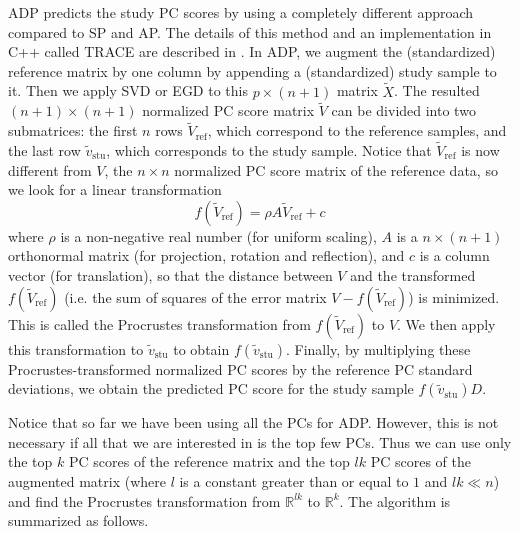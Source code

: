 \documentclass{article}
\newcommand{\bR}{\mathbb{R}}
\newcommand{\ostu}{\operatorname{stu}}
\newcommand{\oref}{\operatorname{ref}}
\begin{document}
ADP predicts the study PC scores by using a completely different approach
compared to SP and AP.
The details of this method
and an implementation in C++ called TRACE
are described in \cite{wang2014ancestry,wang2015improved}.
In ADP,
we augment the (standardized) reference matrix by one column
by appending a (standardized) study sample to it.
Then we apply SVD or EGD to this $p \times (n+1)$ matrix $\tilde{X}$.
The resulted $(n+1) \times (n+1)$ normalized PC score matrix $\tilde{V}$
can be divided into two submatrices:
the first $n$ rows $\tilde{V}_{\oref}$,
which correspond to the reference samples,
and the last row $\tilde{v}_{\ostu}$,
which corresponds to the study sample.
Notice that $\tilde{V}_{\oref}$ is now different from $V$,
the $n \times n$ normalized PC score matrix of the reference data,
so we look for a linear transformation
\[
    f(\tilde{V}_{\oref}) = \rho A \tilde{V}_{\oref} + c
\]
where $\rho$ is a non-negative real number
(for uniform scaling),
$A$ is a $n \times (n+1)$ orthonormal matrix
(for projection, rotation and reflection),
and $c$ is a column vector
(for translation),
so that the distance
between $V$ and the transformed $f(\tilde{V}_{\oref})$
(i.e. the sum of squares of the error matrix $V - f(\tilde{V}_{\oref})$)
is minimized.
This is called the Procrustes transformation
from $f(\tilde{V}_{\oref})$ to $V$.
We then apply this transformation to $\tilde{v}_{\ostu}$
to obtain $f(\tilde{v}_{\ostu})$.
Finally,
by multiplying these Procrustes-transformed normalized PC scores
by the reference PC standard deviations,
we obtain the predicted PC score for the study sample $f(\tilde{v}_{\ostu})D$.

Notice that so far we have been using all the PCs for ADP.
However, this is not necessary
if all that we are interested in
is the top few PCs.
Thus we can use only
the top $k$ PC scores of the reference matrix
and the top $lk$ PC scores of the augmented matrix
(where $l$ is a constant greater than or equal to $1$ and $lk \ll n$)
and find the Procrustes transformation from $\bR^{lk}$ to $\bR^k$.
The algorithm is summarized as follows.
\end{document}
